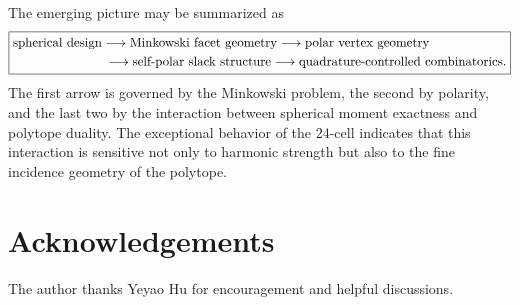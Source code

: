 \documentclass[11pt]{amsart}
\theoremstyle{definition}
\theoremstyle{remark}
\begin{document}
The emerging picture may be summarized as
\[
\boxed{
\begin{aligned}
&\text{spherical design}\longrightarrow\text{Minkowski facet geometry}
\longrightarrow\text{polar vertex geometry}\\
&\hspace{2.5cm}\longrightarrow\text{self-polar slack structure}
\longrightarrow\text{quadrature-controlled combinatorics}.
\end{aligned}}
\]
The first arrow is governed by the Minkowski problem, the second by polarity, and the last two by the interaction between spherical moment exactness and polytope duality.  The exceptional behavior of the $24$-cell indicates that this interaction is sensitive not only to harmonic strength but also to the fine incidence geometry of the polytope.

\section*{Acknowledgements}
The author thanks Yeyao Hu for encouragement and helpful discussions.
\end{document}
